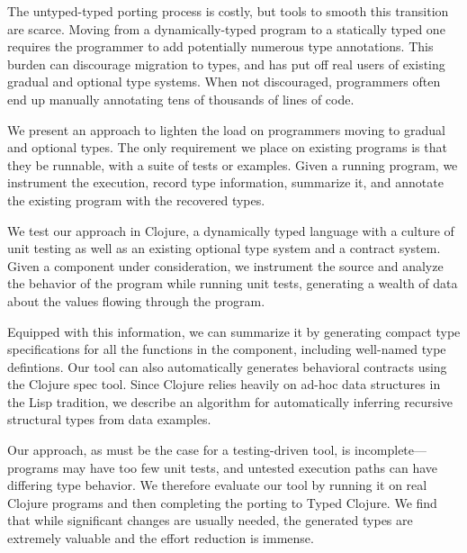   The untyped-typed porting process is costly, but tools to smooth
  this transition are scarce.  Moving from a dynamically-typed program
  to a statically typed one requires the programmer to add potentially
  numerous type annotations. This burden can discourage migration to
  types, and has put off real users of existing gradual and optional
  type systems. When not discouraged, programmers often end up
  manually annotating tens of thousands of lines of code.

We present an approach to lighten the load on programmers moving to
gradual and optional types. The only requirement we place on existing
programs is that they be runnable, with a suite of tests or
examples. Given a running program, we instrument the execution, record
type information, summarize it, and annotate the existing program with
the recovered types.

We test our approach in Clojure, a dynamically typed
language with a culture of unit testing as well as an  existing
optional type system and a contract system. Given a component under
consideration, we instrument the source and analyze the behavior of the
program while running unit tests, generating a wealth of data about
the values flowing through the program.

Equipped with this information, we can summarize it by generating compact
type specifications for all the functions in the component, including
well-named type defintions. Our tool can also automatically generates
behavioral contracts using the Clojure spec tool. Since Clojure relies
heavily on ad-hoc data structures in the Lisp tradition, we describe
an algorithm for automatically inferring recursive structural types
from data examples.

Our approach, as must be the case for a testing-driven tool, is
incomplete---programs may have too few unit tests, and untested
execution paths can have differing type behavior. We therefore
evaluate our tool by running it on real Clojure programs and then
completing the porting to Typed Clojure. We find that while
significant changes are usually needed, the generated types are
extremely valuable and the effort reduction is immense.

